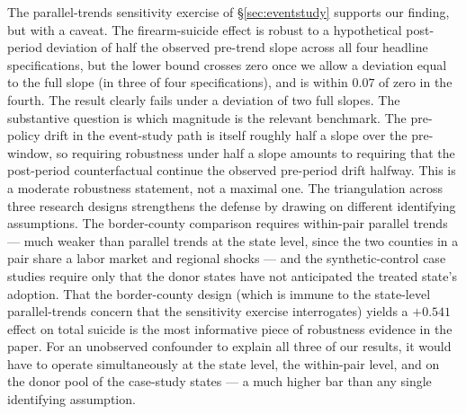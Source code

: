 \documentclass[12pt]{article}
\begin{document}
The parallel-trends sensitivity exercise of §\ref{sec:eventstudy}
supports our finding, but with a caveat. The firearm-suicide effect
is robust to a hypothetical post-period deviation of half the
observed pre-trend slope across all four headline specifications,
but the lower bound crosses zero once we allow a deviation equal
to the full slope (in three of four specifications), and is within
$0.07$ of zero in the fourth. The result clearly fails under a
deviation of two full slopes. The substantive question is which
magnitude is the relevant benchmark. The pre-policy drift in the
event-study path is itself roughly half a slope over the
pre-window, so requiring robustness under half a slope amounts to
requiring that the post-period counterfactual continue the observed
pre-period drift halfway. This is a moderate robustness statement,
not a maximal one. The triangulation across three research designs
strengthens the defense by drawing on different identifying
assumptions. The border-county comparison requires within-pair
parallel trends --- much weaker than parallel trends at the state
level, since the two counties in a pair share a labor market and
regional shocks --- and the synthetic-control case studies require
only that the donor states have not anticipated the treated state's
adoption. That the border-county design (which is immune to the
state-level parallel-trends concern that the sensitivity exercise
interrogates) yields a $+0.541$ effect on total suicide is the
most informative piece of robustness evidence in the paper. For an
unobserved confounder to explain all three of our results, it
would have to operate simultaneously at the state level, the
within-pair level, and on the donor pool of the case-study states
--- a much higher bar than any single identifying assumption.
\end{document}
